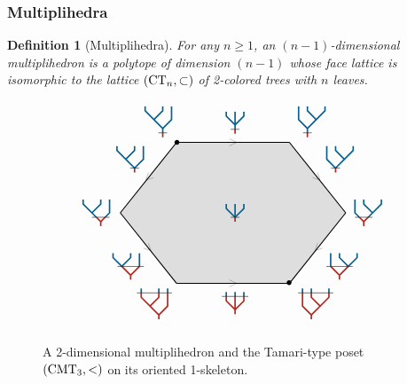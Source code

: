 \documentclass[twoside, 11pt]{amsart}
\newtheorem{definition}{Definition}[section]
\theoremstyle{remark}
\begin{document}

\subsubsection{Multiplihedra} \label{sec:multiplihedra}

\begin{definition}[Multiplihedra]
For any $n\geq 1$, an \emph{$(n-1)$-dimensional multiplihedron} is a polytope of dimension $(n-1)$ whose face lattice is isomorphic to the lattice 
$(\mathrm{CT}_{n}, \subset)$
of 2-colored trees with $n$ leaves. 
\end{definition}

\begin{figure}[h]
\[
\begin{tikzpicture}[xscale=0.8,yscale=1]
\draw[fill, opacity=0.12] (-2,2)--(2,2)--(4,0)--(2,-2)--(-2,-2)--(-4,0)--cycle;
\draw (-2,2) node[above left] {$\TreeLa$};
\draw (2,2) node[above right] {$\TreeRa$};
\draw (-2,-2) node[below left] {$\TreeLc$};
\draw (2,-2) node[below right] {$\TreeRc$};
\draw (-4.2,0) node[left] {$\TreeLb$};
\draw (4,0) node[right] {$\TreeRb$};
\draw (-3,1) node[above left] {$\TreeLab$};
\draw (-3,-1) node[below left] {$\TreeLbc$};
\draw (3,1) node[above right] {$\TreeRab$};
\draw (3,-1) node[below right] {$\TreeRbc$};
\draw (0,2.1) node[above] {$\TreeCa$};
\draw (0,-2.1) node[below] {$\TreeCb$};
\draw (0,0) node  {$\TreeCab$};

\draw (-1.99,1.99) node  {$\bullet$};
\draw (1.99,-1.99) node  {$\bullet$};

\draw[thick] (-2,2)--(2,2) node[midway,sloped,allow upside down,scale=0.1]{\thickmidarrow};
\draw[thick] (2,2)--(4,0) node[midway,sloped,allow upside down,scale=0.1]{\thickmidarrow};
\draw[thick] (4,0)--(2,-2) node[midway,sloped,allow upside down,scale=0.1]{\thickmidarrow};

\draw[thick] (-2,2)--(-4,0) node[midway,sloped,allow upside down,scale=0.1]{\thickmidarrow};
\draw[thick] (-4,0)--(-2,-2) node[midway,sloped,allow upside down,scale=0.1]{\thickmidarrow};
\draw[thick] (-2,-2)--(2,-2) node[midway,sloped,allow upside down,scale=0.1]{\thickmidarrow};
\end{tikzpicture}
\]
\caption{A 2-dimensional multiplihedron and the Tamari-type poset $(\mathrm{CMT}_{3}, <)$ on its oriented 1-skeleton.}
\label{Fig4:J3}
\end{figure}
\end{document}
